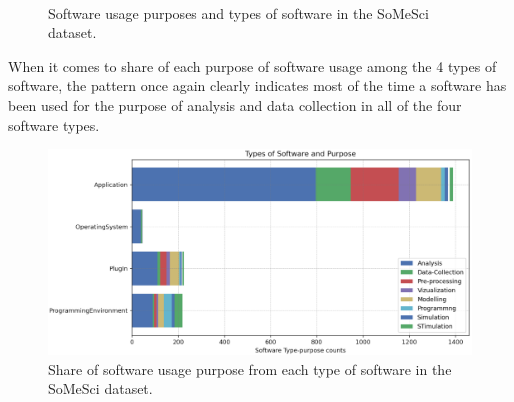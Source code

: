 \begin{figure}[h]
	\myfloatalign
	 \quad
	 \\
	\caption{Software usage purposes and types of software in the SoMeSci dataset.}
	
\end{figure}


When it comes to share of each purpose of software usage among the 4 types of software, the pattern once again clearly indicates most of the time a software has been used for the purpose of analysis and data collection in all of the four software types. \\

\begin{figure}[htbp]
	\centering
	\includegraphics[width=.90\textwidth]{4.graphics/figures/ch_4/analysisresults/6.Types of Software and Purpose stacked bar}
	\caption{Share of software usage purpose from each type of software in the \ac{SoMeSci} dataset.}
	\label{fig:chapter03:setup}
\end{figure}


